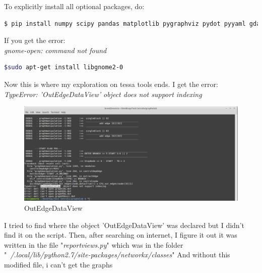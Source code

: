 To explicitly install all optional packages, do:
\begin{lstlisting}[language=bash]
$ pip install numpy scipy pandas matplotlib pygraphviz pydot pyyaml gdal
\end{lstlisting}



If you get the error:\\
\textit{gnome-open: command not found}\\ 
\begin{lstlisting}[language=bash]
$sudo apt-get install libgnome2-0
\end{lstlisting}

Now this is where my exploration on tessa tools ends.
I get the error:\\
\textit{TypeError: 'OutEdgeDataView' object does not support indexing} 	
\begin{figure}[h]
	\centering
	\includegraphics[width=\textwidth]{imm/tessa/OutEdgeDataView.png}  
	\caption{OutEdgeDataView}
	\label{OutEdgeDataView}
\end{figure}
I tried to find where the object 'OutEdgeDataView' was declared but I didn't find it on the script. Then, after searching on internet, I figure it out it was written in the file "\textit{reportviews.py}" which was in the folder "\textit{~/.local/lib/python2.7/site-packages/networkx/classes}"
And without this modified file, i can't get the graphs
\begin{lstlisting}[language=bash]
\end{lstlisting}



